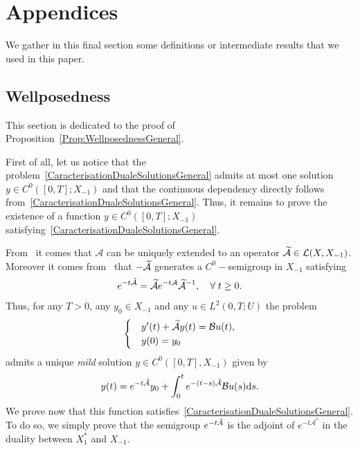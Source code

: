 \documentclass[AHL,Unicode,longabstracts]{cedram}
\newcommand\A{\mathcal{A}}
\newcommand\As{\mathcal{A}^*}
\newcommand\B{\mathcal{B}}
\newcommand{\Xuns}{X_1^*}
\newcommand{\Xmun}{X_{-1}}
\newcommand{\LL}{\mathcal{L}}
\newcommand{\md}{\mathrm{d}}
\let\oldtilde\tilde
\renewcommand*{\tilde}[1]{\mathchoice{\widetilde{#1}}{\widetilde{#1}}{\oldtilde{#1}}{\oldtilde{#1}}}\let\oldexists\exists
\renewcommand*{\exists}{\mathrel{\oldexists}}
\let\oldforall\forall
\renewcommand*{\forall}{\mathrel{\oldforall}}
\begin{document}
\section{Appendices} \label{Sec:Annexe}

We gather in this final section some definitions or intermediate results that we used in this paper.


\subsection{Wellposedness} \label{Sec:AnnexeWellposedness}


This section is dedicated to the proof of Proposition~\ref{Prop:WellposednessGeneral}.

First of all, let us notice that the problem~\eqref{CaracterisationDualeSolutionsGeneral} admits at most one solution $y \in C^0([0,T]; \Xmun)$ and that the continuous dependency directly follows from~\eqref{CaracterisationDualeSolutionsGeneral}. Thus, it remains to prove the existence of a function $y \in C^0([0,T]; \Xmun)$ satisfying~\eqref{CaracterisationDualeSolutionsGeneral}.

From~\cite[Proposition~2.10.3]{TucsnakWeissBook} it comes that $\A$ can be uniquely extended to an operator $\tilde{\A} \in \LL(X, \Xmun)$. Moreover it comes from~\cite[Proposition~2.10.4]{TucsnakWeissBook} that $-\tilde{\A}$ generates a $C^0-$semigroup in $\Xmun$ satisfying
\begin{equation*}\label{Def:SemiGroupeEtendu}
e^{-t \tilde{\A}} = \tilde{\A} e^{-t \A} \tilde{\A}^{-1}, \quad \forall t \geq 0.
\end{equation*}
Thus, for any $T>0$, any $y_0 \in \Xmun$ and any $u \in L^2(0,T ; U)$ the problem
\begin{equation*}\label{systemeEtendu}
\begin{cases}
&y'(t) + \tilde{\A} y(t) = \B u(t),
\\
&y(0) = y_0
\end{cases}
\end{equation*}
admits a unique \emph{mild} solution $y \in C^0([0,T], \Xmun)$ given by
\begin{equation}\label{MildSolution}
y(t) = e^{-t \tilde{\A}} y_0 + \int_0^t e^{-(t-s) \tilde{\A}} \B u(s) \md s.
\end{equation}
We prove now that this function satisfies~\eqref{CaracterisationDualeSolutionsGeneral}. To do so, we simply prove that the semigroup $e^{-t \tilde{A}}$ is the adjoint of $e^{-t\As}$ in the duality between $\Xuns$ and $\Xmun$.
\end{document}
